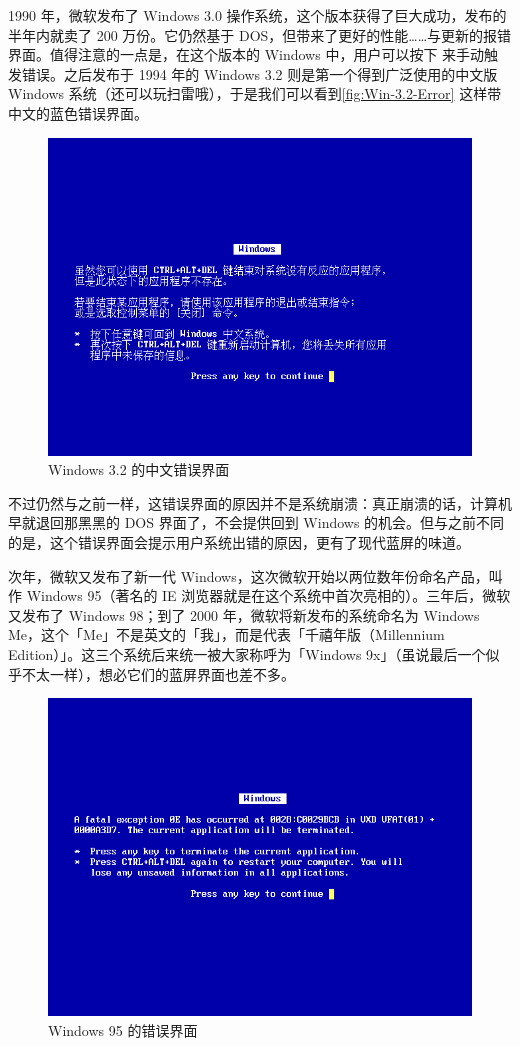 1990 年，微软发布了 Windows 3.0 操作系统，这个版本获得了巨大成功，发布的半年内就卖了 200 万份。它仍然基于 DOS，但带来了更好的性能……与更新的报错界面。值得注意的一点是，在这个版本的 Windows 中，用户可以按下  来手动触发错误。之后发布于 1994 年的 Windows 3.2 则是第一个得到广泛使用的中文版 Windows 系统（还可以玩扫雷哦），于是我们可以看到\autoref{fig:Win-3.2-Error} 这样带中文的蓝色错误界面。

\begin{figure}[htb!]
  \centering
  \includegraphics[width=.65\textwidth]{assets/advanced/Win-3.2-Error.png}
  \caption{Windows 3.2 的中文错误界面}
  \label{fig:Win-3.2-Error}
\end{figure}

不过仍然与之前一样，这错误界面的原因并不是系统崩溃：真正崩溃的话，计算机早就退回那黑黑的 DOS 界面了，不会提供回到 Windows 的机会。但与之前不同的是，这个错误界面会提示用户系统出错的原因，更有了现代蓝屏的味道。

次年，微软又发布了新一代 Windows，这次微软开始以两位数年份命名产品，叫作 Windows 95（著名的 IE 浏览器就是在这个系统中首次亮相的）。三年后，微软又发布了 Windows 98；到了 2000 年，微软将新发布的系统命名为 Windows Me，这个「Me」不是英文的「我」，而是代表「千禧年版（Millennium Edition）」。这三个系统后来统一被大家称呼为「Windows 9x」（虽说最后一个似乎不太一样），想必它们的蓝屏界面也差不多。

\begin{figure}[htb!]
  \centering
  \includegraphics[width=.65\textwidth]{assets/advanced/Win-95-Error.png}
  \caption{Windows 95 的错误界面}
  \label{fig:Win-95-Error}
\end{figure}

